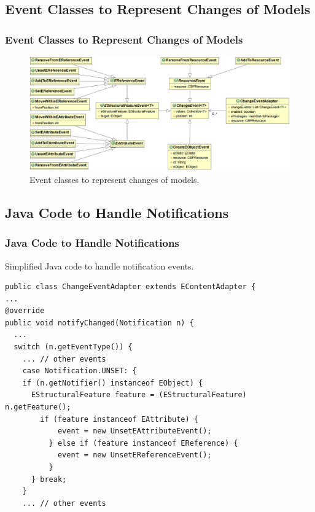 \documentclass{beamer}
\begin{document}
\begin{frame}
\section{Event Classes to Represent Changes of Models}
\frametitle{Event Classes to Represent Changes of Models}
\begin{figure}[htbh]
\centering
\includegraphics[width=\linewidth]{events}
\caption{Event classes to represent changes of models.}
\label{fig:events}
\end{figure}
\end{frame}

\begin{frame}[fragile]
\section{Java Code to Handle Notifications}
\frametitle{Java Code to Handle Notifications}
Simplified Java code to handle notification events.
\begin{lstlisting}[style=java,label=lst:javacode]
public class ChangeEventAdapter extends EContentAdapter {
...
@override
public void notifyChanged(Notification n) {
  ...
  switch (n.getEventType()) {
    ... // other events
    case Notification.UNSET: {
    if (n.getNotifier() instanceof EObject) {
      EStructuralFeature feature = (EStructuralFeature) n.getFeature();
        if (feature instanceof EAttribute) {
            event = new UnsetEAttributeEvent();
          } else if (feature instanceof EReference) {
            event = new UnsetEReferenceEvent();
          }
      } break;
    } 
    ... // other events
\end{lstlisting}

\end{frame}
\end{document}
